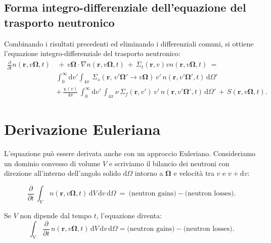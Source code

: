 \subsection{Forma integro-differenziale dell'equazione del trasporto neutronico}
Combinando i risultati precedenti ed eliminando i differenziali comuni, si ottiene l'equazione integro-differenziale del trasporto neutronico:
\begin{equation}
	\begin{aligned}
		\frac{\partial}{\partial t} n(\mathbf{r}, v\boldsymbol{\Omega}, t) &\,+\, v\boldsymbol{\Omega} \cdot \nabla n(\mathbf{r}, v\boldsymbol{\Omega}, t)\, +\, \Sigma_t(\mathbf{r}, v) v n(\mathbf{r}, v\boldsymbol{\Omega}, t)\ =\\
		&\int_0^\infty \mathrm{d}v' \int_{4\pi}\, \Sigma_s(\mathbf{r},\, v'\boldsymbol{\Omega}' \rightarrow v\boldsymbol{\Omega})\, v'\, n(\mathbf{r}, v'\boldsymbol{\Omega}', t)\, \mathrm{d}\Omega' \\
		&+\, \frac{\chi(v)}{4\pi}\, \int_0^\infty \mathrm{d}v' \,\int_{4\pi} \nu\, \Sigma_f(\mathbf{r}, v')\, v'\, n(\mathbf{r}, v'\boldsymbol{\Omega}', t)\, \mathrm{d}\Omega' \,+\, S(\mathbf{r}, v\boldsymbol{\Omega}, t).
	\end{aligned}
\end{equation}


%
%
\section{Derivazione Euleriana}
L'equazione può essere derivata anche con un approccio Euleriano. Consideriamo un dominio convesso di volume $V$ e scriviamo il bilancio dei neutroni con direzione all'interno dell'angolo solido $\mathrm{d}\Omega$ intorno a $\boldsymbol{\Omega}$ e velocità tra $v$ e $v + \mathrm{d}v$:

\begin{equation}
	\frac{\partial}{\partial t}\, \int_{V}\, n(\mathbf{r}, v \boldsymbol{\Omega}, t) \, \mathrm{d}V \, \mathrm{d}v \, \mathrm{d}\Omega\ =\ \text{(neutron gains)} - \text{(neutron losses)}.
\end{equation}

Se $V$ non dipende dal tempo $t$, l’equazione diventa:
\begin{equation}
	\int_{V}\, \frac{\partial}{\partial t}\, n(\mathbf{r}, v \boldsymbol{\Omega}, t) \, \mathrm{d}V \, \mathrm{d}v \, \mathrm{d}\Omega = \text{(neutron gains)} - \text{(neutron losses)}.
\end{equation}


